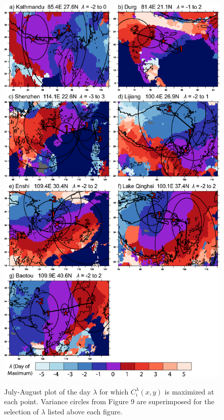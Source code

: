 \documentclass[12pt]{article}
\begin{document}
\begin{figure}[t]
  \noindent\includegraphics[width=32pc,angle=0]{fig10kmax}\\
  \caption{July-August plot of the day $\lambda$ for which $C_i^\lambda(x,y)$ is maximized at each point. Variance circles from Figure 9 are superimposed for the selection of $\lambda$ listed above each figure.}\label{f10}
\end{figure}
\end{document}

